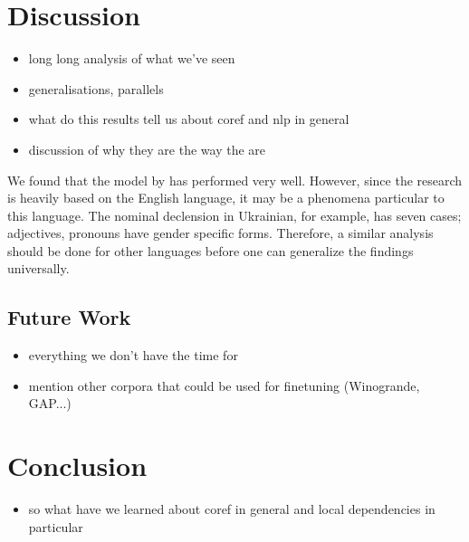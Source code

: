 \documentclass[11pt]{article}
\begin{document}
\section{Discussion}

\begin{itemize}
\item long long analysis of what we've seen
\item generalisations, parallels
\item what do this results tell us about coref and nlp in general
\item discussion of why they are the way the are
\end{itemize}

We found that the model by \textcite{joshi2019coref} has performed very well. 
However, since the research is heavily based on the English language, it may be a phenomena particular to this language. The nominal declension in Ukrainian, for example, has seven cases; adjectives, pronouns have gender specific forms. Therefore, a similar analysis should be done for other languages before one can generalize the findings universally. %

\subsection{Future Work}
\begin{itemize}
\item everything we don't have the time for
\item mention other corpora that could be used for finetuning (Winogrande, GAP...)

\end{itemize}

\section{Conclusion}

\begin{itemize}
\item so what have we learned about coref in general and local dependencies in particular
\end{itemize}

\printbibliography
\end{document}
